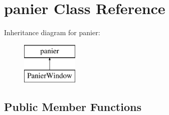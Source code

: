 \hypertarget{classpanier}{}\section{panier Class Reference}
\label{classpanier}
Inheritance diagram for panier\+:\begin{figure}[H]
\begin{center}
\leavevmode
\includegraphics[height=2.000000cm]{classpanier}
\end{center}
\end{figure}
\subsection*{Public Member Functions}
